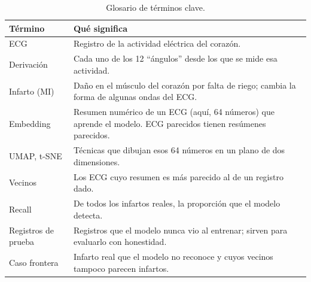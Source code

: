 \documentclass[conference]{IEEEtran}
\begin{document}
\begin{table}[t]
\centering
\caption{Glosario de términos clave.}
\label{tab:glosario}
\small
\renewcommand{\arraystretch}{1.1}
\begin{tabular}{L{2.2cm} L{5.9cm}}
\toprule
Término & Qué significa \\
\midrule
ECG & Registro de la actividad eléctrica del corazón. \\
Derivación & Cada uno de los 12 ``ángulos'' desde los que se mide esa actividad. \\
Infarto (MI) & Daño en el músculo del corazón por falta de riego; cambia la forma de algunas ondas del ECG. \\
Embedding & Resumen numérico de un ECG (aquí, 64 números) que aprende el modelo. ECG parecidos tienen resúmenes parecidos. \\
UMAP, t-SNE & Técnicas que dibujan esos 64 números en un plano de dos dimensiones. \\
Vecinos & Los ECG cuyo resumen es más parecido al de un registro dado. \\
Recall & De todos los infartos reales, la proporción que el modelo detecta. \\
Registros de prueba & Registros que el modelo nunca vio al entrenar; sirven para evaluarlo con honestidad. \\
Caso frontera & Infarto real que el modelo no reconoce y cuyos vecinos tampoco parecen infartos. \\
\bottomrule
\end{tabular}
\end{table}
\end{document}
